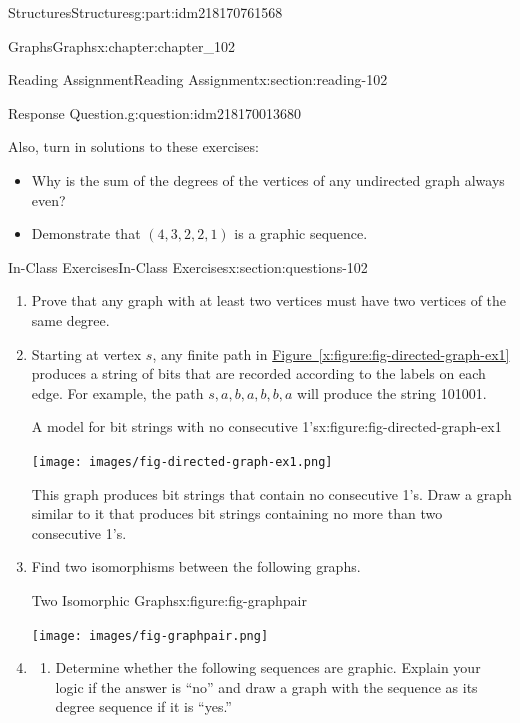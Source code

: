 \documentclass[oneside,10pt,]{book}
\newcommand{\xreffont}{\relax}
\numberwithin{equation}{section}
\begin{document}
\begin{partptx}{Structures}{}{Structures}{}{}{g:part:idm218170761568}
\begin{chapterptx}{Graphs}{}{Graphs}{}{}{x:chapter:chapter_102}
\begin{sectionptx}{Reading Assignment}{}{Reading Assignment}{}{}{x:section:reading-102}
\begin{question}{Response Question.}{g:question:idm218170013680}
\end{question}
Also, turn in solutions to these exercises:%
\begin{itemize}[label=\textbullet]
\item{}Why is the sum of the degrees of the vertices of any undirected graph always even?%
\item{}Demonstrate that \((4,3,2,2,1)\) is a graphic sequence.%
\end{itemize}
%
\end{sectionptx}
%
%
\typeout{************************************************}
\typeout{************************************************}
%
\begin{sectionptx}{In-Class Exercises}{}{In-Class Exercises}{}{}{x:section:questions-102}
%
\begin{enumerate}[label=\arabic*.]
\item{}Prove that any graph with at least two vertices must have two vertices of the same degree.%
\item{}Starting at vertex \(s\), any finite path in \hyperref[x:figure:fig-directed-graph-ex1]{Figure~{\xreffont\ref{x:figure:fig-directed-graph-ex1}}} produces a string of bits that are recorded according to the labels on each edge.  For example, the path \(s,a,b,a,b,b,a\) will produce the string 101001.%
\begin{figureptx}{A model for bit strings with no consecutive 1's}{x:figure:fig-directed-graph-ex1}{}%
\begin{image}{0.15}{0.7}{0.15}%
\texttt{[image: images/fig-directed-graph-ex1.png]}
\end{image}%
\tcblower
\end{figureptx}%
This graph produces bit strings that contain no consecutive 1's.   Draw a graph similar to it that produces bit strings containing no more than two consecutive 1's.%
\item{}Find two isomorphisms between the following graphs.%
\begin{figureptx}{Two Isomorphic Graphs}{x:figure:fig-graphpair}{}%
\begin{image}{0.15}{0.7}{0.15}%
\texttt{[image: images/fig-graphpair.png]}
\end{image}%
\tcblower
\end{figureptx}%
\item{}%
\begin{enumerate}[label=(\alph*)]
\item{}Determine whether the following sequences are graphic. Explain your logic if the answer is ``no'' and draw a graph with the sequence as its degree sequence if it is ``yes.''%

\end{enumerate}
\end{enumerate}
\end{sectionptx}
\end{chapterptx}
\end{partptx}
\end{document}
